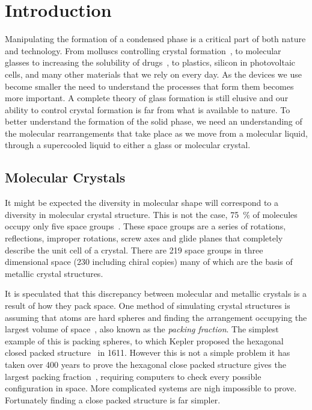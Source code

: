 
\chapter{Introduction}


Manipulating the formation of a condensed phase is a critical part of both nature and technology. From molluscs controlling crystal formation~\cite{de-yoreo:03}, to molecular glasses to increasing the solubility of drugs~\cite{hancock:00}, to plastics\tocite, silicon in photovoltaic cells\tocite, and many other materials that we rely on every day. As the devices we use become smaller the need to understand the processes that form them becomes more important. A complete theory of glass formation is still elusive and our ability to control crystal formation is far from what is available to nature. To better understand the formation of the solid phase, we need an understanding of the molecular rearrangements that take place as we move from a molecular liquid, through a supercooled liquid to either a glass or molecular crystal.

\section{Molecular Crystals}

It might be expected the diversity in molecular shape will correspond to a diversity in molecular crystal structure. This is not the case, \SI{75}{\percent} of molecules occupy only five space groups~\cite{brock:94}. These space groups are a series of rotations, reflections, improper rotations, screw axes and glide planes that completely describe the unit cell of a crystal. There are 219 space groups in three dimensional space (230 including chiral copies) many of which are the basis of metallic crystal structures.

It is speculated that this discrepancy between molecular and metallic crystals is a result of how they pack space. One method of simulating crystal structures is assuming that atoms are hard spheres and finding the arrangement occupying the largest volume of space~\cite{kitaigorodskii:73}, also known as the \emph{packing fraction}. The simplest example of this is packing spheres, to which Kepler proposed the hexagonal closed packed structure~\figref{} in 1611\cite{kepler:1611}. However this is not a simple problem it has taken over 400 years to prove the hexagonal close packed structure gives the largest packing fraction~\cite{hales:05,hales:14}, requiring computers to check every possible configuration in space. More complicated systems are nigh impossible to prove. Fortunately finding a close packed structure is far simpler.

